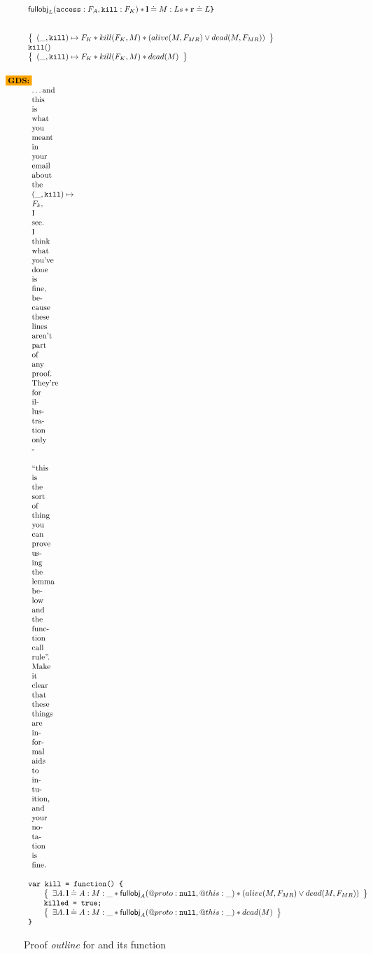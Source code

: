 \documentclass[a4paper]{article}
\begin{document}
\begin{figure}[b]
\[\begin{array}{l}
{{            \fullobj_L(\js{access}:F_A,\js{kill}:F_K) \sep
            \ls \doteq M:Ls \sep
            \rv \doteq L
          }
        }
        \tjs{\}} \\
        \\
        \\
        \logic{
          (\_,\js{kill}) \pointsto F_K \sep kill(F_K,M) \sep (alive(M, F_{MR}) \lor dead(M, F_{MR}))
        } \\
        \js{kill()} \\
        \logic{
          (\_,\js{kill}) \pointsto F_K \sep kill(F_K,M) \sep dead(M)
        } \\
        \gds{\dots and this is what you meant in your email about the $(\_,\js{kill})\pointsto F_k$, I see. I think what you've done is fine, because these lines aren't part of any proof. They're for illustration only - ``this is the sort of thing you can prove using the lemma below and the function call rule''. Make it clear that these things are informal aids to intuition, and your notation is fine.}
        \\
        \tjs{var kill = function() \{} \\
        \indblock{
          \logic{
            \exists A \st \ls \doteq A : M : \_ \sep
            \fullobj_A(@proto: \nil, @this: \_) \sep
            (alive(M, F_{MR}) \lor dead(M, F_{MR}))
          } \\
          \tjs{killed = true;} \\
          \logic{
            \exists A \st \ls \doteq A : M : \_ \sep
            \fullobj_A(@proto: \nil, @this: \_) \sep
            dead(M)
          }
        }
        \tjs{\}}
    \end{array}
  \]
  \caption{Proof \emph{outline} for  and its  function}
\end{figure}
\end{document}

